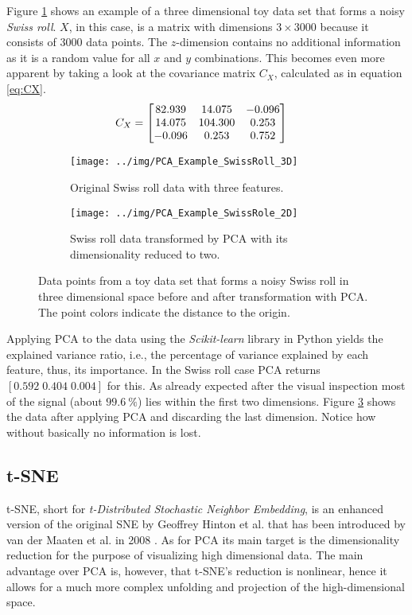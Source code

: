 Figure \ref{fig:PCA_Example_SwissRoll_3D} shows an example of a three dimensional toy data set that forms a noisy \textit{Swiss roll}. $X$, in this case, is a matrix with dimensions $3 \times 3000$ because it consists of $3000$ data points. The $z$-dimension contains no additional information as it is a random value for all $x$ and $y$ combinations. This becomes even more apparent by taking a look at the covariance matrix $C_X$, calculated as in equation \ref{eq:CX}. 
\begin{align*}
C_X &=
\begin{bmatrix}
82.939 &  14.075 & -0.096 \cr
14.075 &  104.300 & 0.253 \cr
-0.096 & 0.253 & 0.752
\end{bmatrix}
\end{align*}
\begin{figure}[H]
\begin{subfigure}{0.45\textwidth}
\texttt{[image: ../img/PCA\_Example\_SwissRoll\_3D]}
\caption{Original Swiss roll data with three features.}\label{fig:PCA_Example_SwissRoll_3D}
\end{subfigure}
\begin{subfigure}{0.45\textwidth}
\texttt{[image: ../img/PCA\_Example\_SwissRole\_2D]}
\caption{Swiss roll data transformed by PCA with its dimensionality reduced to two.}\label{fig:PCA_Example_SwissRoll_2D}
\end{subfigure}
\caption{Data points from a toy data set that forms a noisy Swiss roll in three dimensional space before and after transformation with PCA. The point colors indicate the distance to the origin.}
\end{figure}
\noindent Applying PCA to the data using the \textit{Scikit-learn} library \cite{scikit-learn} in Python yields the explained variance ratio, i.e., the percentage of variance explained by each feature, thus, its importance. In the Swiss roll case PCA returns $[0.592\; 0.404\; 0.004]$ for this. As already expected after the visual inspection most of the signal (about $99.6\:\%$) lies within the first two dimensions. Figure \ref{fig:PCA_Example_SwissRoll_2D} shows the data after applying PCA and discarding the last dimension. Notice how without basically no information is lost. 

\subsection{t-SNE}
\label{subsec:t-SNE}
t-SNE, short for \textit{t-Distributed Stochastic Neighbor Embedding}, is an enhanced version of the original SNE by Geoffrey Hinton et al. \cite{SNE} that has been introduced by van der Maaten et al. in 2008 \cite{tSNE}. As for PCA its main target is the dimensionality reduction for the purpose of visualizing high dimensional data. The main advantage over PCA is, however, that t-SNE's reduction is nonlinear, hence it allows for a much more complex unfolding and projection of the high-dimensional space.

